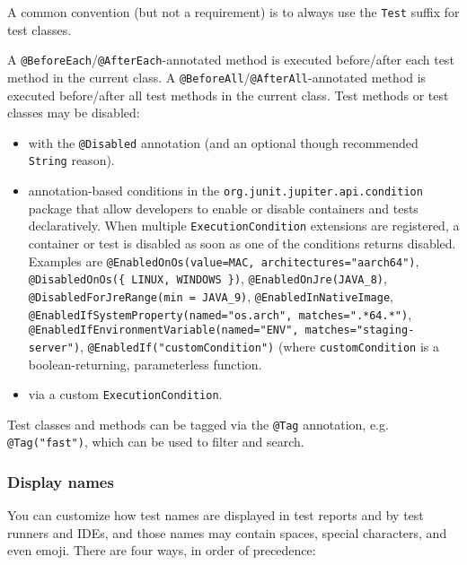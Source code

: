 \documentclass[8pt, table, xcdraw]{article}%
\begin{document}
A common convention (but not a requirement) is to always use the \lstinline{Test} suffix for test classes.

A \lstinline{@BeforeEach}/\lstinline{@AfterEach}-annotated method is executed before/after each test method in the current class. A \lstinline{@BeforeAll}/\lstinline{@AfterAll}-annotated method is executed before/after all test methods in the current class. Test methods or test classes may be disabled:

\begin{itemize}
    \item with the \lstinline{@Disabled} annotation (and an optional though recommended \lstinline{String} reason).
    \item annotation-based conditions in the \lstinline{org.junit.jupiter.api.condition} package that allow developers to enable or disable containers and tests declaratively. When multiple \lstinline{ExecutionCondition} extensions are registered, a container or test is disabled as soon as one of the conditions returns disabled. Examples are \lstinline{@EnabledOnOs(value=MAC, architectures="aarch64")}, \lstinline|@DisabledOnOs({ LINUX, WINDOWS })|, \lstinline{@EnabledOnJre(JAVA_8)}, \lstinline{@DisabledForJreRange(min = JAVA_9)}, \lstinline{@EnabledInNativeImage}, \lstinline{@EnabledIfSystemProperty(named="os.arch", matches=".*64.*")}, \lstinline{@EnabledIfEnvironmentVariable(named="ENV", matches="staging-server")}, \lstinline{@EnabledIf("customCondition")} (where \lstinline{customCondition} is a boolean-returning, parameterless function.
    \item via a custom \lstinline{ExecutionCondition}.
\end{itemize}

Test classes and methods can be tagged via the \lstinline{@Tag} annotation, e.g. \lstinline{@Tag("fast")}, which can be used to filter and search.

\subsubsection{Display names}

You can customize how test names are displayed in test reports and by test runners and IDEs, and those names may contain spaces, special characters, and even emoji. There are four ways, in order of precedence:
\end{document}
